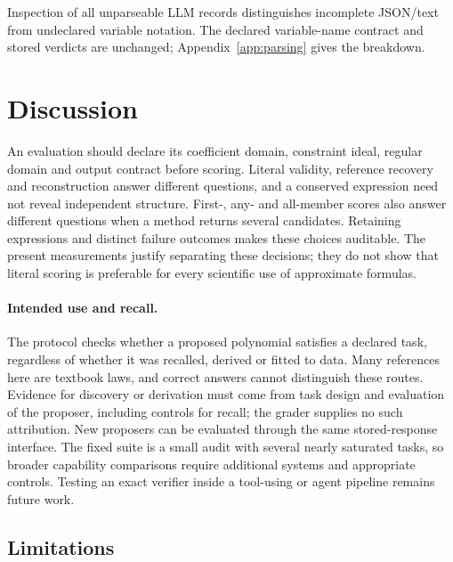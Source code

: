 \documentclass[10pt]{article}
\begin{document}
Inspection of all \nUnparseable{} unparseable LLM records distinguishes incomplete JSON/text from undeclared variable notation. The declared variable-name contract and stored verdicts are unchanged; Appendix~\ref{app:parsing} gives the breakdown.

\section{Discussion}\label{sec:discussion}

An evaluation should declare its coefficient domain, constraint ideal, regular domain and output contract before scoring. Literal validity, reference recovery and reconstruction answer different questions, and a conserved expression need not reveal independent structure. First-, any- and all-member scores also answer different questions when a method returns several candidates. Retaining expressions and distinct failure outcomes makes these choices auditable. The present measurements justify separating these decisions; they do not show that literal scoring is preferable for every scientific use of approximate formulas.

\paragraph{Intended use and recall.} The protocol checks whether a proposed polynomial satisfies a declared task, regardless of whether it was recalled, derived or fitted to data. Many references here are textbook laws, and correct answers cannot distinguish these routes. Evidence for discovery or derivation must come from task design and evaluation of the proposer, including controls for recall; the grader supplies no such attribution. New proposers can be evaluated through the same stored-response interface. The fixed suite is a small audit with several nearly saturated tasks, so broader capability comparisons require additional systems and appropriate controls. Testing an exact verifier inside a tool-using or agent pipeline remains future work.

\subsection{Limitations}\label{sec:limitations}
\end{document}
